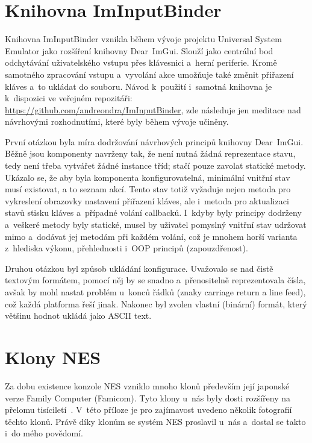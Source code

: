 \chapter{Knihovna ImInputBinder}
\label{apx:binder}

Knihovna ImInputBinder vznikla během vývoje projektu Universal System Emulator jako rozšíření knihovny Dear~ImGui. Slouží jako centrální bod odchytávání uživatelského vstupu přes klávesnici a~herní periferie. Kromě samotného zpracování vstupu a~vyvolání akce umožňuje také změnit přiřazení kláves a~to ukládat do souboru. Návod k~použití i~samotná knihovna je k~dispozici ve veřejném repozitáři: \url{https://github.com/andreondra/ImInputBinder}, zde následuje jen meditace nad návrhovými rozhodnutími, které byly během vývoje učiněny.

První otázkou byla míra dodržování návrhových principů knihovny Dear~ImGui. Běžně jsou komponenty navrženy tak, že není nutná žádná reprezentace stavu, tedy není třeba vytvářet žádné instance tříd; stačí pouze zavolat statické metody. Ukázalo se, že aby byla komponenta konfigurovatelná, minimální vnitřní stav musí existovat, a to seznam akcí. Tento stav totiž vyžaduje nejen metoda pro vykreslení obrazovky nastavení přiřazení kláves, ale i~metoda pro aktualizaci stavů stisku kláves a~případné volání callbacků. I~kdyby byly principy dodrženy a~veškeré metody byly statické, musel by uživatel pomyslný vnitřní stav udržovat mimo a~dodávat jej metodám při každém volání, což je mnohem horší varianta z~hlediska výkonu, přehlednosti i~OOP principů (zapouzdřenost).

Druhou otázkou byl způsob ukládání konfigurace. Uvažovalo se nad čistě textovým formátem, pomocí něj by se snadno a~přenositelně reprezentovala čísla, avšak by mohl nastat problém u~konců řádků (znaky carriage return a line feed), což každá platforma řeší jinak. Nakonec byl zvolen vlastní (binární) formát, který většinu hodnot ukládá jako ASCII text.

\chapter{Klony NES}
\label{apx:klony-nes}
Za dobu existence konzole NES vzniklo mnoho klonů především její japonské verze Family Computer (Famicom). Tyto klony u~nás byly dosti rozšířeny na přelomu tisíciletí~\cite{Svara:polystation}. V~této příloze je pro zajímavost uvedeno několik fotografií těchto klonů. Právě díky klonům se systém NES proslavil u~nás a~dostal se takto i~do mého povědomí.

